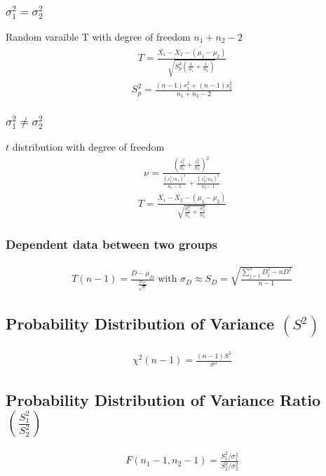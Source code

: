 \documentclass[twocolumn]{article}
\begin{document}
\subsubsection{$\sigma_{1}^{2} = \sigma_{2}^{2}$}
Random varaible T with degree of freedom $n_{1}+n_{2}-2$
\begin{align*}
    T = \frac{\bar{X_{1}} - \bar{X_{2} - (\mu_{1} - \mu_{2})}}{\sqrt{S_{p}^{2}(\frac{1}{n_{1}} + \frac{1}{n_{2}})}}
\end{align*}
\begin{align*}
    S^{2}_{p} = \frac{(n-1)s_{1}^{2}+(n-1)s_{2}^{2}}{n_{1} + n_{2} - 2}
\end{align*}
\subsubsection{$\sigma_{1}^{2} \neq \sigma_{2}^{2}$}
$t$ distribution with degree of freedom
\begin{align*}
    \nu = \frac{(\frac{s_{1}^{2}}{n_{1}} + \frac{s_{2}^{2}}{n_{2}})^{2}}{\frac{(s_{1}^{2}/n_{1})^{2}}{n_{1} - 1}\frac{}{} + \frac{(s_{2}^{2}/n_{2})^{2}}{n_{2} - 1}}
\end{align*}
\begin{align*}
    T = \frac{\bar{X_{1}} - \bar{X_{2}} - (\mu_{1} - \mu_{2})}{\sqrt{\frac{\sigma_{1}^{2}}{n_{1}} + \frac{\sigma_{2}^{2}}{n_{2}}}}
\end{align*}
\subsubsection{Dependent data between two groups}
\begin{align*}
    T(n-1) = \frac{\bar{D} - \mu_{D}}{\frac{\sigma_{D}}{\sqrt{n}}} \text{ with } \sigma_{D} \approx S_{D} = \sqrt{\frac{\sum_{j=1}^{n}D_{j}^{2} - nD^{2}}{n-1}}
\end{align*}
\subsection{Probability Distribution of Variance $(S^{2})$}
\begin{align*}
    \chi^{2}(n-1) = \frac{(n-1)S^{2}}{\sigma^{2}}
\end{align*}
\subsection{Probability Distribution of Variance Ratio $(\frac{S_{1}^{2}}{S_{2}^{2}})$}
\begin{align*}
    F(n_{1}-1, n_{2}-1) = \frac{S_{1}^2 / \sigma_{1}^{2}}{S_{2}^2 / \sigma_{2}^{2}}
\end{align*}
\end{document}
